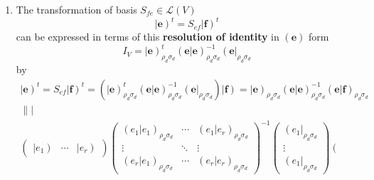 \documentclass[aps,preprint]{revtex4}
\begin{document}
\begin{enumerate}
\item The transformation of basis $S_{fe}\in \mathcal{L}\left( V\right) $ 
\begin{equation}
\left\vert \boldsymbol{e}\right) ^{t}=S_{ef}\left\vert \boldsymbol{f}\right)
^{t}
\end{equation}%
can be expressed in terms of this \textbf{resolution of identity} in $\left( 
\boldsymbol{e}\right) $ form 
\begin{equation}
I_{V}=\left\vert \boldsymbol{e}\right) _{\rho _{d}\sigma _{d}}^{t}\left(
\left. \boldsymbol{e}\right\vert \boldsymbol{e}\right) _{\rho _{d}\sigma
_{d}}^{-1}\left( \boldsymbol{e}\right\vert _{\rho _{d}\sigma _{d}}
\end{equation}
by 
\begin{gather}
\left\vert \boldsymbol{e}\right) ^{t}=S_{ef}\left\vert \boldsymbol{f}\right)
^{t}=\left( \overset{}{\left\vert \boldsymbol{e}\right) _{\rho _{d}\sigma
_{d}}^{t}\left( \left. \boldsymbol{e}\right\vert \boldsymbol{e}\right)
_{\rho _{d}\sigma _{d}}^{-1}\left( \boldsymbol{e}\right\vert _{\rho
_{d}\sigma _{d}}}\right) \left\vert \boldsymbol{f}\right) =\left\vert 
\boldsymbol{e}\right) _{\rho _{d}\sigma _{d}}\left( \left. \boldsymbol{e}%
\right\vert \boldsymbol{e}\right) _{\rho _{d}\sigma _{d}}^{-1}\left( \left. 
\boldsymbol{e}\right\vert \boldsymbol{f}\right) _{\rho _{d}\sigma _{d}} \\
\parallel \mid \\
\left( 
\begin{array}{ccc}
\left\vert e_{1}\right) & \cdots & \left\vert e_{r}\right)%
\end{array}%
\right) \left( 
\begin{array}{ccc}
\left( \left. e_{1}\right\vert e_{1}\right) _{\rho _{d}\sigma _{d}} & \cdots
& \left( \left. e_{1}\right\vert e_{r}\right) _{\rho _{d}\sigma _{d}} \\ 
\vdots & \ddots & \vdots \\ 
\left( \left. e_{r}\right\vert e_{1}\right) _{\rho _{d}\sigma _{d}} & \cdots
& \left( \left. e_{r}\right\vert e_{r}\right) _{\rho _{d}\sigma _{d}}%
\end{array}%
\right) ^{\boldsymbol{-}1}\left( 
\begin{array}{c}
\left( e_{1}\right\vert _{\rho _{d}\sigma _{d}} \\ 
\vdots \\ 
\left( e_{1}\right\vert _{\rho _{d}\sigma _{d}}%
\end{array}%
\right) \left( 
\begin{array}{ccc}

\end{array}
\end{gather}
\end{enumerate}
\end{document}
